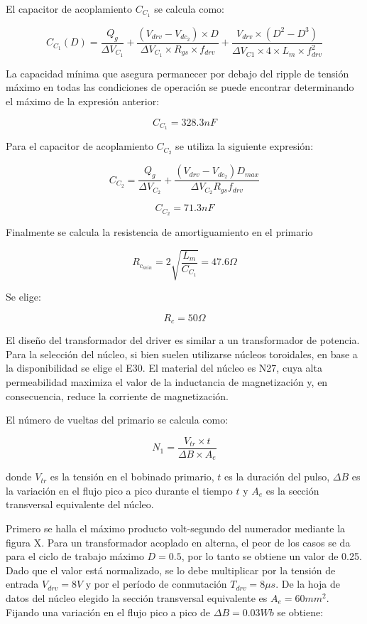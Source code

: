 El capacitor de acoplamiento $C_{C_1}$ se calcula como:

$$ C_{C_1}(D)=\frac{Q_g}{\Delta V_{C_1}}+\frac{(V_{drv}-V_{{dc}_2})\times D}{\Delta V_{C_1}\times R_{gs}\times f_{drv}}+\frac{V_{drv}\times (D^2-D^3)}{\Delta V_{C1}\times 4\times L_m\times f_{drv}^2} $$

La capacidad mínima que asegura permanecer por debajo del ripple de tensión máximo en todas las condiciones de operación 
se puede encontrar determinando el máximo de la expresión anterior:

$$ C_{C_1}=328.3nF $$

Para el capacitor de acoplamiento $C_{C_2}$ se utiliza la siguiente expresión:

$$ C_{C_2}=\frac{Q_g}{\Delta V_{C_2}}+\frac{(V_{drv}-V_{dc_2})D_{max}}{\Delta V_{C_2}R_{gs}f_{drv}} $$

$$ C_{C_2}=71.3nF $$

Finalmente se calcula la resistencia de amortiguamiento en el primario

$$ R_{c_{min}}=2\sqrt{\frac{L_m}{C_{C_1}}}=47.6\Omega $$

Se elige:

$$ R_c=50\Omega $$

El diseño del transformador del driver es similar a un transformador de potencia. 
Para la selección del núcleo, si bien suelen utilizarse núcleos toroidales, en base a la disponibilidad se elige el E30. 
El material del núcleo es N27, cuya alta permeabilidad maximiza el valor de 
la inductancia de magnetización y, en consecuencia, reduce la corriente de magnetización.

El número de vueltas del primario se calcula como: 

$$ N_{1}=\frac {V_{tr}\times t}{\Delta B \times A_{e}} $$

donde $V_{tr}$ es la tensión en el bobinado primario, $t$ es la duración del pulso, 
$\Delta B$ es la variación en el flujo pico a pico durante el tiempo $t$ y $A_{e}$ es la sección transversal equivalente del núcleo. 


Primero se halla el máximo producto volt-segundo del numerador mediante la figura X.
Para un transformador acoplado en alterna, el peor de los casos se da para el ciclo de trabajo máximo $D=0.5$, por lo tanto se obtiene un valor de 0.25. 
Dado que el valor está normalizado, se lo debe multiplicar por la tensión de entrada $V_{drv}=8V$ y por el período de conmutación $T_{drv}=8\mu s$.
De la hoja de datos del núcleo elegido la sección transversal equivalente es $A_{e}=60mm^2$. 
Fijando una variación en el flujo pico a pico de $\Delta B=0.03Wb$ se obtiene: 

